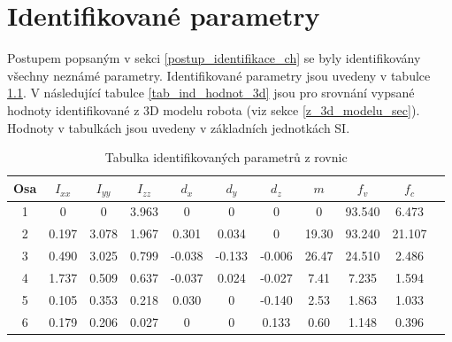 

\chapter{Identifikované parametry}
\label{identifikovane_parametry_ch}
Postupem popsaným v sekci \ref{postup_identifikace_ch} se byly identifikovány všechny neznámé parametry. Identifikované parametry jsou uvedeny v tabulce \ref{tab_ind_hodnot}. V následující tabulce \ref{tab_ind_hodnot_3d} jsou pro srovnání vypsané hodnoty identifikované z 3D modelu robota (viz sekce \ref{z_3d_modelu_sec}). Hodnoty v tabulkách jsou uvedeny v základních jednotkách SI. 
\\
\begin{table}[htbp]
  \centering
  \caption{Tabulka identifikovaných parametrů z rovnic}
    \begin{tabular}{c|cccccccccc}
    \multicolumn{1}{c|}{Osa} & \multicolumn{1}{c}{$I_{xx}$} & \multicolumn{1}{c}{$I_{yy}$} & \multicolumn{1}{c}{$I_{zz}$} & \multicolumn{1}{c}{$d_x$} & \multicolumn{1}{c}{$d_y$} & \multicolumn{1}{c}{$d_z$} & \multicolumn{1}{c}{$m$} & \multicolumn{1}{c}{$f_v$} & \multicolumn{1}{c}{$f_c$} \\
    \hline
    1  & 0     & 0     & 3.963 & 0     & 0     & 0     & 0     & 93.540 &  6.473 \\
    2  & 0.197 & 3.078 & 1.967 & 0.301 & 0.034 & 0     & 19.30 & 93.240 & 21.107 \\
    3  & 0.490 & 3.025 & 0.799 &-0.038 &-0.133 &-0.006 & 26.47 & 24.510 &  2.486 \\
    4  & 1.737 & 0.509 & 0.637 &-0.037 & 0.024 &-0.027 & 7.41  &  7.235 &  1.594 \\
    5  & 0.105 & 0.353 & 0.218 & 0.030 & 0     &-0.140 & 2.53  &  1.863 &  1.033 \\
    6  & 0.179 & 0.206 & 0.027 & 0     & 0     & 0.133 & 0.60  &  1.148 &  0.396 \\
    \end{tabular}%
  \label{tab_ind_hodnot}%
\end{table}%

